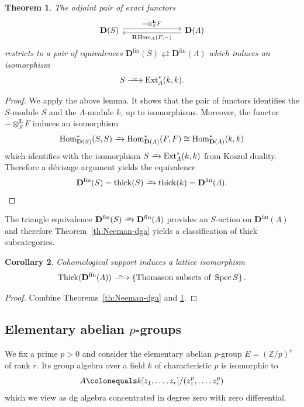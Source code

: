 \documentclass{amsart}[a4]
\newtheorem{theorem}{Theorem}[section]
\newtheorem{corollary}[theorem]{Corollary}
\theoremstyle{definition}
\theoremstyle{remark}
\numberwithin{equation}{section}
\newcommand{\Ext}{\operatorname{Ext}}
\newcommand{\Hom}{\operatorname{Hom}}
\newcommand{\RHom}{\operatorname{{\mathbf R}Hom}}
\newcommand{\Spec}{\operatorname{Spec}}
\newcommand{\thick}{\operatorname{thick}}
\newcommand{\Thick}{\operatorname{Thick}}
\newcommand{\iso}{\xrightarrow{\raisebox{-.6ex}[0ex][0ex]{$\scriptstyle{\sim}$}}}
\newcommand{\longiso}{\xrightarrow{\
    \raisebox{-.6ex}[0ex][0ex]{$\scriptstyle{\sim}$}\ }}
\newcommand{\lotimes}{\otimes^{\mathbf L}}
\newcommand{\fin}{\mathrm{fin}}
\newcommand{\bfD}{\mathbf D}
\newcommand{\bbZ}{\mathbb Z}
\let\Lambda\varLambda
\begin{document}
\begin{theorem}\label{th:BGG-dga}
      The adjoint pair of exact functors
\begin{equation*}
\begin{tikzcd}[column sep = large]
\bfD(S) \ar[rr,yshift=2.5,"-\lotimes_S F"] &&  \ar[ll,yshift=-2.5,"{\RHom_\Lambda(F,-)}"]
\bfD(\Lambda)
\end{tikzcd}
\end{equation*}    
restricts to a pair of equivalences
$\bfD^\fin(S) \rightleftarrows
\bfD^\fin(\Lambda)$ which induces an isomorphism
\[S\longiso\Ext_\Lambda^*(k,k).\]
\end{theorem}
\begin{proof}
  We apply the above lemma. It shows that the pair of functors
  identifies the $S$-module $S$ and the $\Lambda$-module $k$, up to
  isomorphisms. Moreover, the functor $-\lotimes_S F$ induces an
  isomorphism
\[\Hom^*_{\bfD(S)}(S,S)\iso \Hom^*_{\bfD(\Lambda)}(F,F)\cong
  \Hom^*_{\bfD(\Lambda)}(k,k)\] which identifies with the isomorphism
$S\iso\Ext_\Lambda^*(k,k)$ from Koszul duality. Therefore a d{\'e}visage argument
yields the equivalence
\[\bfD^\fin(S)=\thick(S) \iso\thick(k)= \bfD^\fin(\Lambda).\qedhere\]
\end{proof}

The triangle equivalence $\bfD^\fin(S)\iso \bfD^\fin(\Lambda)$
provides an $S$-action on $\bfD^\fin(\Lambda)$ and therefore
Theorem~\ref{th:Neeman-dga} yields a classification of thick
subcategories.

\begin{corollary}\label{co:BGG-dga}
  Cohomological support induces a lattice isomorphism
  \begin{equation*}
     \Thick(\bfD^\fin(\Lambda))\longiso\{\text{Thomason subsets of }\Spec
     S\}\,.
\end{equation*}  
\end{corollary}
\begin{proof}
Combine  Theorems~\ref{th:Neeman-dga} and \ref{th:BGG-dga}.
\end{proof}


\subsection*{Elementary abelian $p$-groups}

We fix a prime $p>0$ and consider the elementary abelian $p$-group
$E=(\bbZ/p)^r$ of rank $r$. Its group algebra over a field $k$ of
characteristic $p$ is isomorphic to
\[A\colonequals k[z_1,\ldots,z_r]/(z_1^p,\ldots,z_r^p)\] which we view as dg algebra
concentrated in degree zero with zero differential.
\end{document}
